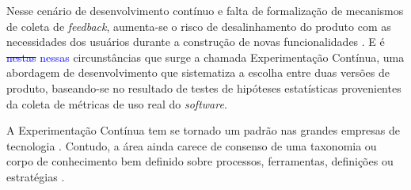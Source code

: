 Nesse cenário de desenvolvimento contínuo e falta de formalização de mecanismos de coleta de \textit{feedback}, aumenta-se o risco de desalinhamento do produto com as necessidades dos usuários durante a construção de novas funcionalidades \cite{olsson2013data}. E é \textcolor{blue}{\st{nestas}} \textcolor{blue}{nessas}  circunstâncias que surge a chamada Experimentação Contínua, uma abordagem de desenvolvimento que sistematiza a escolha entre duas versões de produto, baseando-se no resultado de testes de hipóteses estatísticas provenientes da coleta de métricas de uso real do \textit{software}.

A Experimentação Contínua tem se tornado um padrão nas grandes empresas de tecnologia \cite{kohavi_seven_2014}. Contudo, a área ainda carece de consenso de uma taxonomia ou corpo de conhecimento bem definido sobre processos, ferramentas, definições ou estratégias \cite{erthal_characterization_2023}.

